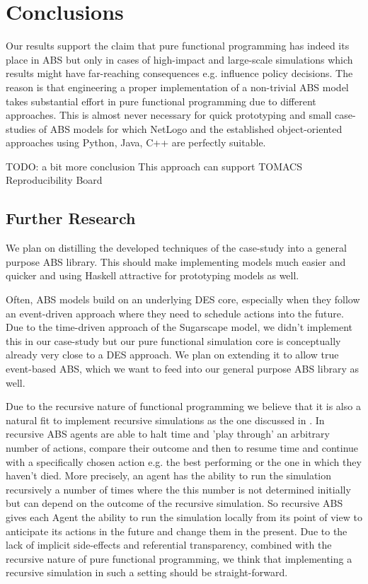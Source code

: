 \section{Conclusions}
\label{sec:conclusions}
Our results support the claim that pure functional programming has indeed its place in ABS but only in cases of high-impact and large-scale simulations which results might have far-reaching consequences e.g. influence policy decisions. The reason is that engineering a proper implementation of a non-trivial ABS model takes substantial effort in pure functional programming due to different approaches. This is almost never necessary for quick prototyping and small case-studies of ABS models for which NetLogo and the established object-oriented approaches using Python, Java, C++ are perfectly suitable.

TODO: a bit more conclusion
This approach can support TOMACS Reproducibility Board

\subsection{Further Research}
We plan on distilling the developed techniques of the case-study into a general purpose ABS library. This should make implementing models much easier and quicker and using Haskell attractive for prototyping models as well. 

Often, ABS models build on an underlying DES core, especially when they follow an event-driven approach \cite{meyer_event-driven_2014} where they need to schedule actions into the future. Due to the time-driven approach of the Sugarscape model, we didn't implement this in our case-study but our pure functional simulation core is conceptually already very close to a DES approach. We plan on extending it to allow true event-based ABS, which we want to feed into our general purpose ABS library as well.

Due to the recursive nature of functional programming we believe that it is also a natural fit to implement recursive simulations as the one discussed in \cite{gilmer_recursive_2000}. In recursive ABS agents are able to halt time and 'play through' an arbitrary number of actions, compare their outcome and then to resume time and continue with a specifically chosen action e.g. the best performing or the one in which they haven't died. More precisely, an agent has the ability to run the simulation recursively a number of times where the this number is not determined initially but can depend on the outcome of the recursive simulation. So recursive ABS gives each Agent the ability to run the simulation locally from its point of view to anticipate its actions in the future and change them in the present. Due to the lack of implicit side-effects and referential transparency, combined with the recursive nature of pure functional programming, we think that implementing a recursive simulation in such a setting should be straight-forward.

